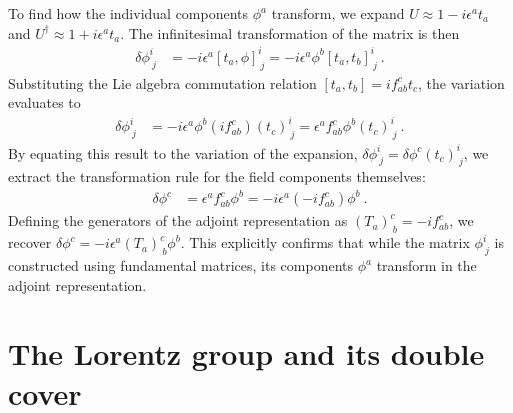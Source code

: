 \documentclass[11pt]{article}
\begin{document}
To find how the individual components $\phi^a$ transform, we expand $U\approx 1 - i \epsilon^a t_a$ and $U^\dagger\approx 1 + i \epsilon^a t_a$. The infinitesimal transformation of the matrix is then
\begin{align}
    \delta \phi^i_{\: j} &= -i \epsilon^a [t_a, \phi]^i_{\: j} = -i \epsilon^a \phi^b [t_a, t_b]^i_{\: j}\ .
\end{align}
Substituting the Lie algebra commutation relation $[t_a, t_b]=i f_{ab}^c t_c$, the variation evaluates to
\begin{align}
    \delta \phi^i_{\: j} &= -i \epsilon^a \phi^b (i f_{ab}^c) (t_c)^i_{\: j} = \epsilon^a f_{ab}^c \phi^b (t_c)^i_{\: j}\ .
\end{align}
By equating this result to the variation of the expansion, $\delta \phi^i_{\: j}=\delta \phi^c (t_c)^i_{\: j}$, we extract the transformation rule for the field components themselves:
\begin{align}
    \delta \phi^c &= \epsilon^a f_{ab}^c \phi^b = -i \epsilon^a (-i f_{ab}^c) \phi^b\ .
\end{align}
Defining the generators of the adjoint representation as $(T_a)^c_{\: b}=-i f_{ab}^c$, we recover $\delta \phi^c=-i \epsilon^a (T_a)^c_{\: b} \phi^b$. This explicitly confirms that while the matrix $\phi^i_{\: j}$ is constructed using fundamental matrices, its components $\phi^a$ transform in the adjoint representation.

\section{The Lorentz group and its double cover}
\end{document}
